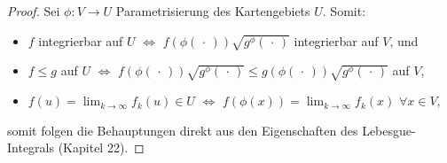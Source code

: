\begin{proof}
	Sei $\phi\colon V\to U$ Parametrisierung des Kartengebiets $U$. Somit:\begin{itemize}
		\item $f$ integrierbar auf $U$ $\Leftrightarrow$ $f(\phi(\,\cdot\,))\sqrt{g^\phi(\,\cdot\,)}$ integrierbar auf $V$, und \item $f\le g$ auf $U$ $\Leftrightarrow$ $f(\phi(\,\cdot\,))\sqrt{g^\phi(\,\cdot\,)} \le g(\phi(\,\cdot\,))\sqrt{g^\phi(\,\cdot\,)}$ auf $V$,
		\item $f(u) = \lim_{k\to\infty} f_k(u)\in U$ $\Leftrightarrow$ $f(\phi(x)) = \lim_{k\to\infty}  f_k(x)$ $\forall x\in V$,
	\end{itemize}
	somit folgen die Behauptungen direkt aus den Eigenschaften des Lebesgue-Integrals (Kapitel 22).
\end{proof}